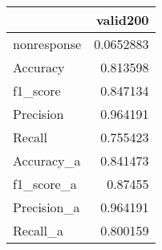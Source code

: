 
\begin{tabular}{lr}
\hline
             &     valid200 \\
\hline
 nonresponse & 0.0652883 \\
 Accuracy    & 0.813598  \\
 f1_score    & 0.847134  \\
 Precision   & 0.964191  \\
 Recall      & 0.755423  \\
 Accuracy_a  & 0.841473  \\
 f1_score_a  & 0.87455   \\
 Precision_a & 0.964191  \\
 Recall_a    & 0.800159  \\
\hline
\end{tabular}